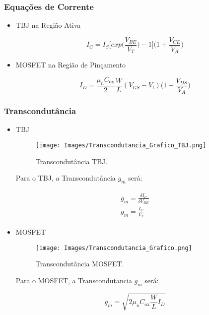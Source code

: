 \documentclass[12pt]{article}
\begin{document}
\subsubsection{Equações de Corrente}

\begin{itemize}
  \item TBJ na Região Ativa
  
  $$
    I_C = I_S \Biggl [ exp \Big (\frac{V_{BE}}{V_T} \Big ) -1 \Biggl ] \Biggl (1 + \frac{V_{CE}}{V_A} \Biggl )
  $$


  \item MOSFET na Região de Pinçamento
  
  $$
    I_D = \frac{\mu_n C_{\text{ox}}}{2} \frac{W}{L} (V_{GS}-V_t) \Biggl (1 + \frac{V_{DS}}{V_A} \Biggl )
  $$

\end{itemize}

\subsubsection{Transcondutância}

\begin{itemize}
  \item TBJ
  
  \begin{figure}[H]
    \begin{center}
      \texttt{[image: Images/Transcondutancia\_Grafico\_TBJ.png]}
    \end{center}
    \caption{Transcondutância TBJ.}
    \label{fig:transc_tbj}
  \end{figure}

  Para o TBJ, a Transcondutância $g_m$ será:

  \begin{align}
    \begin{split}
      g_m = \frac{\delta I_C}{\delta V_{BE}} \\[0.3cm]
      g_m = \frac{I_C}{V_T}
    \end{split}
  \end{align}

  \item MOSFET
  
  \begin{figure}[H]
    \begin{center}
      \texttt{[image: Images/Transcondutancia\_Grafico.png]}
    \end{center}
    \caption{Transcondutância MOSFET.}
    \label{fig:transc_mosfet}
  \end{figure}

  Para o MOSFET, a Transcondutancia $g_m$ será:

  $$
    g_m = \sqrt{2 \mu_n C_{\text{ox}} \frac{W}{L} I_D}
  $$

\end{itemize}
\end{document}
